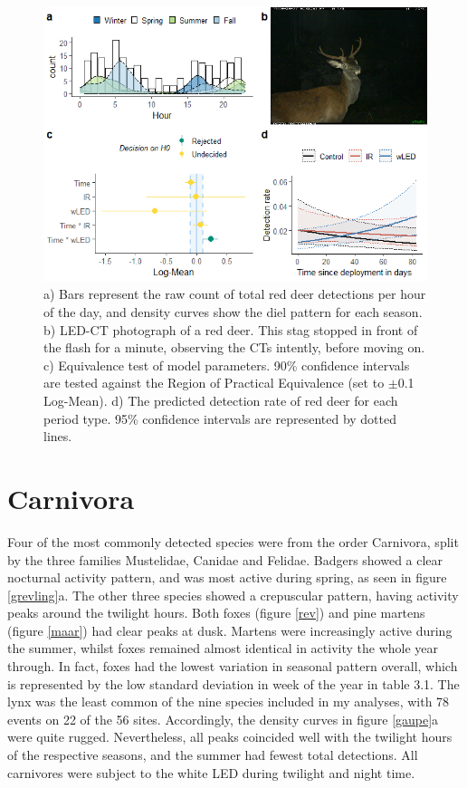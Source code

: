 \begin{figure}[t]
		  \centering
	\includegraphics[width=12cm]{../R/glmm_sp_files/figure-html/hjort2-1.png}
\caption[Red deer]
{\scriptsize
	a) Bars represent the raw count of total red deer detections per hour of the day, and density curves show the diel pattern for each season.
	b) LED-CT photograph of a red deer. This stag stopped in front of the flash for a minute, observing the CTs intently, before moving on.
	c) Equivalence test of model parameters. 90\% confidence intervals are tested against the Region of Practical Equivalence (set to $\pm$0.1 Log-Mean).
	d) The predicted detection rate of red deer for each period type. 95\% confidence intervals are represented by dotted lines.}
\label{hjort}
\end{figure}


\section{Carnivora}
Four of the most commonly detected species were from the order Carnivora, split by the three families Mustelidae, Canidae and Felidae. 
Badgers showed a clear nocturnal activity pattern, and was most active during spring, as seen in figure \ref{grevling}a. 
The other three species showed a crepuscular pattern, having activity peaks around the twilight hours.
Both foxes (figure \ref{rev}) and pine martens (figure \ref{maar}) had clear peaks at dusk. Martens were increasingly active during the summer, whilst foxes remained almost identical in activity the whole year through. In fact, foxes had the lowest variation in seasonal pattern overall, which is represented by the low standard deviation in week of the year in table 3.1.
The lynx was the least common of the nine species included in my analyses, with 78 events on 22 of the 56 sites. Accordingly, the density curves in figure \ref{gaupe}a were quite rugged. Nevertheless, all peaks coincided well with the twilight hours of the respective seasons, and the summer had fewest total detections.
All carnivores were subject to the white LED during twilight and night time.


